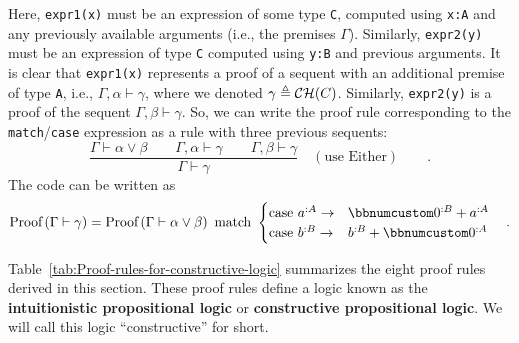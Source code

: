 \noindent Here, \lstinline!expr1(x)! must be an expression of some
type \lstinline!C!, computed using \lstinline!x:A! and any previously
available arguments (i.e., the premises $\Gamma$). Similarly, \lstinline!expr2(y)!
must be an expression of type \lstinline!C! computed using \lstinline!y:B!
and previous arguments. It is clear that \lstinline!expr1(x)! represents
a proof of a sequent with an additional premise of type \lstinline!A!,
i.e., $\Gamma,\alpha\vdash\gamma$, where we denoted $\gamma\triangleq{\cal CH}(C)$.
Similarly, \lstinline!expr2(y)! is a proof of the sequent $\Gamma,\beta\vdash\gamma$.
So, we can write the proof rule corresponding to the \lstinline!match!/\lstinline!case!
expression as a rule with three previous sequents:
\[
\frac{\Gamma\vdash\alpha\vee\beta\quad\quad\Gamma,\alpha\vdash\gamma\quad\quad\Gamma,\beta\vdash\gamma}{\Gamma\vdash\gamma}\quad(\text{use Either})\quad\quad.
\]
The code can be written as
\[
\text{Proof}\left(\Gamma\vdash\gamma\right)=\text{Proof}\left(\Gamma\vdash\alpha\vee\beta\right)\text{ match }\begin{cases}
\text{case }a^{:A}\rightarrow & \bbnum 0^{:B}+a^{:A}\\
\text{case }b^{:B}\rightarrow & b^{:B}+\bbnum 0^{:A}
\end{cases}\quad.
\]

Table~\ref{tab:Proof-rules-for-constructive-logic} summarizes the
eight proof rules derived in this section. These proof rules define
a logic known as the \textbf{intuitionistic
propositional logic} or \textbf{constructive
propositional logic}. We will call this logic \textsf{``}constructive\textsf{''} for
short.

